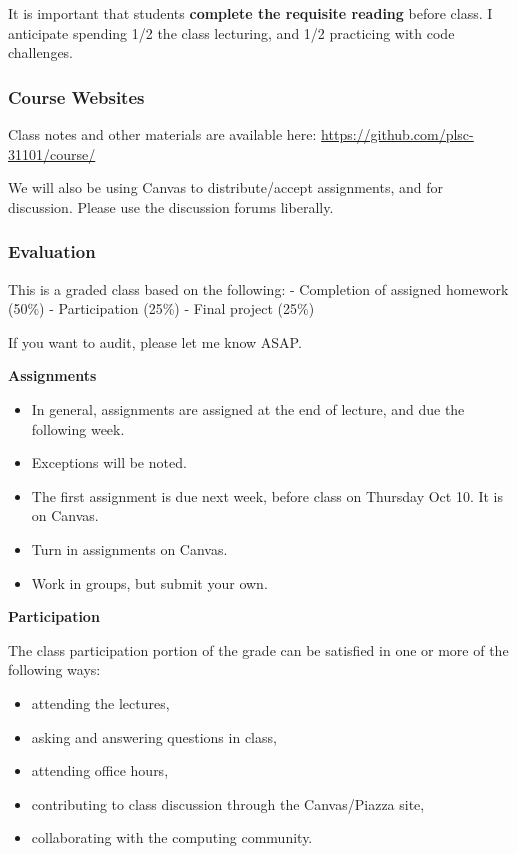 \documentclass[]{book}
\providecommand{\tightlist}{%
  \setlength{\itemsep}{0pt}\setlength{\parskip}{0pt}}
\begin{document}
It is important that students \textbf{complete the requisite reading}
before class. I anticipate spending 1/2 the class lecturing, and 1/2
practicing with code challenges.

\subsubsection*{Course Websites}\label{course-websites}

Class notes and other materials are available here:
\url{https://github.com/plsc-31101/course/}

We will also be using Canvas to distribute/accept assignments, and for
discussion. Please use the discussion forums liberally.

\subsubsection*{Evaluation}\label{evaluation}

This is a graded class based on the following: - Completion of assigned
homework (50\%) - Participation (25\%) - Final project (25\%)

If you want to audit, please let me know ASAP.

\textbf{Assignments}

\begin{itemize}
\tightlist
\item
  In general, assignments are assigned at the end of lecture, and due
  the following week.
\item
  Exceptions will be noted.
\item
  The first assignment is due next week, before class on Thursday Oct
  10. It is on Canvas.
\item
  Turn in assignments on Canvas.
\item
  Work in groups, but submit your own.
\end{itemize}

\textbf{Participation}

The class participation portion of the grade can be satisfied in one or
more of the following ways:

\begin{itemize}
\tightlist
\item
  attending the lectures,
\item
  asking and answering questions in class,
\item
  attending office hours,
\item
  contributing to class discussion through the Canvas/Piazza site,
\item
  collaborating with the computing community.
\end{itemize}
\end{document}
